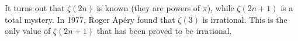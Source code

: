 \begin{remark}
It turns out that $\zeta(2n)$ is known (they are powers of $\pi$), while $\zeta(2n+1)$ is a total mystery. In 1977, Roger Apéry found that $\zeta(3)$ is irrational. This is the only value of $\zeta(2n+1)$ that has been proved to be irrational.
\end{remark}
